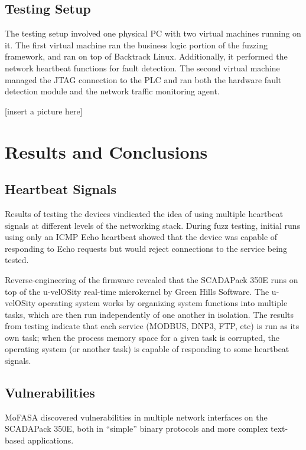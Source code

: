 \documentclass{report}
\begin{document}
\section{Testing Setup}

The testing setup involved one physical PC with two virtual machines running on it. The first virtual machine ran the business logic portion of the fuzzing framework,
and ran on top of Backtrack Linux. Additionally, it performed the network heartbeat functions for fault detection.
The second virtual machine managed the JTAG connection to the PLC and ran both the hardware fault detection module and the network traffic monitoring agent.

[insert a picture here]

\chapter{Results and Conclusions}

\section{Heartbeat Signals}

Results of testing the devices vindicated the idea of using multiple heartbeat signals at different levels of the networking stack. During fuzz testing,
initial runs using only an ICMP Echo heartbeat showed that the device was capable of responding to Echo requests but would reject connections to the service
being tested.

Reverse-engineering of the firmware revealed that the SCADAPack 350E runs on top of the u-velOSity real-time microkernel by Green Hills Software. The
u-velOSity operating system works by organizing system functions into multiple tasks, which are then run independently of one another in isolation.
The results from testing indicate that each service (MODBUS, DNP3, FTP, etc) is run as its own task; when the process memory space for a given task
is corrupted, the operating system (or another task) is capable of responding to some heartbeat signals.

\section{Vulnerabilities}

MoFASA discovered vulnerabilities in multiple network interfaces on the SCADAPack 350E, both in ``simple'' binary protocols and more complex
text-based applications.
\end{document}
